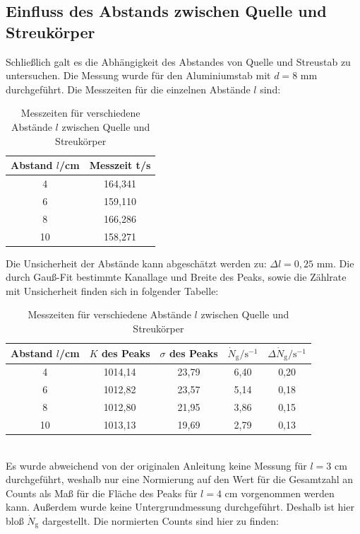 \documentclass[german,  %
parskip=full,  %
]{scrartcl}
\begin{document}
\subsection{Einfluss des Abstands zwischen Quelle und Streukörper}
Schließlich galt es die Abhängigkeit des Abstandes von Quelle und Streustab zu untersuchen. Die Messung wurde für den Aluminiumstab mit $d=8$ mm durchgeführt. Die Messzeiten für die einzelnen Abstände $l$ sind:
\begin{table}[h!]\centering
\begin{tabular}{|c|c|}\hline
Abstand $l$/cm & Messzeit t/s \\\hline
4  & 164,341	\\\hline
6   &  159,110	\\\hline
8   &  166,286	\\\hline
10   & 158,271	\\\hline
\end{tabular}
\caption{Messzeiten für verschiedene Abstände $l$ zwischen Quelle und Streukörper}
\end{table}
Die Unsicherheit der Abstände kann abgeschätzt werden zu: $\Delta l = 0,25$ mm. Die durch Gauß-Fit bestimmte Kanallage und Breite des Peaks, sowie die Zählrate mit Unsicherheit finden sich in folgender Tabelle:
\\
\begin{table}[h!]\centering
\begin{tabular}{|c|c|c|c|c|}\hline
Abstand $l$/cm & $K$ des Peaks & $\sigma$ des Peaks & $\dot{N}_{\text{g}}/\text{s}^{-1}$ &  $\Delta \dot{N}_{\text{g}}/\text{s}^{-1}$\\\hline
4  & 1014,14 & 23,79 & 6,40 & 0,20	\\\hline
6   &  1012,82 & 23,57 & 5,14 & 0,18	\\\hline
8   &  1012,80 & 21,95 & 3,86 & 0,15	\\\hline
10   & 1013,13 & 19,69 & 2,79 & 0,13	\\\hline
\end{tabular}
\caption{Messzeiten für verschiedene Abstände $l$ zwischen Quelle und Streukörper}
\end{table}
\\
Es wurde abweichend von der originalen Anleitung keine Messung für $l=3$ cm durchgeführt, weshalb nur eine Normierung auf den Wert für die Gesamtzahl an Counts als Maß für die Fläche des Peaks für $l=4$ cm vorgenommen werden kann. Außerdem wurde keine Untergrundmessung durchgeführt. Deshalb ist hier bloß $\dot{N}_{\text{g}}$ dargestellt. Die normierten Counts sind hier zu finden:
\end{document}
